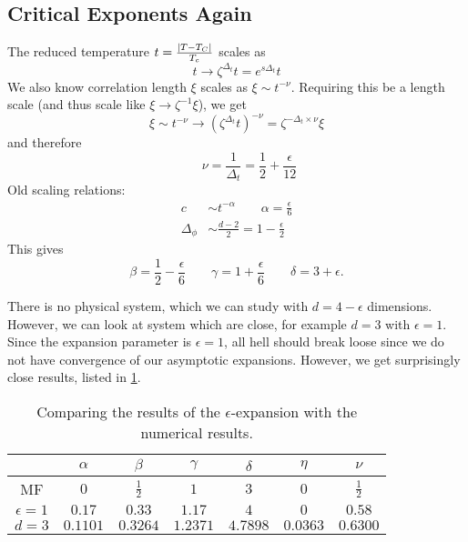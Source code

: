 \subsection{Critical Exponents Again}%
\label{sub:critical_exponents_again}

The reduced temperature $t = \frac{\abs{T - T_C}}{T_c}$ scales as
\begin{equation}
  t \to \zeta^{\Delta_t}t = e^{s \Delta_t}t
\end{equation}
We also know correlation length $\xi$ scales as $\xi \sim t^{-\nu}$. Requiring this be a length scale (and thus scale like $\xi \to \zeta^{-1} \xi$), we get
\begin{equation}
  \xi \sim t^{-\nu} \to (\zeta^{\Delta_t} t)^{-\nu} = \zeta^{- \Delta_t \times \nu} \xi
\end{equation}
and therefore
\begin{equation}
  \qquad \nu = \frac{1}{\Delta_t} = \frac{1}{2} + \frac{\epsilon}{12}
\end{equation}
Old scaling relations:
\begin{align}
  c &\sim t^{-\alpha} \qquad \alpha = \frac{\epsilon}{6} \\
  \Delta_\phi &\sim \frac{d-2}{2} = 1 - \frac{\epsilon}{2}
\end{align}
This gives
\begin{equation}
  \beta = \frac{1}{2}- \frac{\epsilon}{6} \qquad \gamma = 1 + \frac{\epsilon}{6} \qquad \delta = 3 + \epsilon.
\end{equation}

There is no physical system, which we can study with $d = 4-\epsilon$ dimensions.
However, we can look at system which are close, for example $d = 3$ with $\epsilon = 1$. Since the expansion parameter is $\epsilon = 1$, all hell should break loose since we do not have convergence of our asymptotic expansions.
However, we get surprisingly close results, listed in \ref{tab:epsilon-1}.

\begin{table}[htpb]
  \centering
  \caption{Comparing the results of the $\epsilon$-expansion with the numerical results.}
  \label{tab:epsilon-1}
  \begin{tabular}{c | c c c c c c}
     & $\alpha$ & $\beta$ & $\gamma$ & $\delta$ & $\eta$ & $\nu$ \\
     \hline
    MF & $0$ & $\frac{1}{2}$ & $1$ & $3$ & $0$ & $\frac{1}{2}$ \\
    $\epsilon = 1$ & $0.17$ & $0.33$ & $1.17$ & $4$ & $0$ & $0.58$ \\
    $d = 3$ & $0.1101$ & $0.3264$ & $1.2371$ & $4.7898$ & $0.0363$ & $0.6300$ \\
  \end{tabular}
\end{table}

